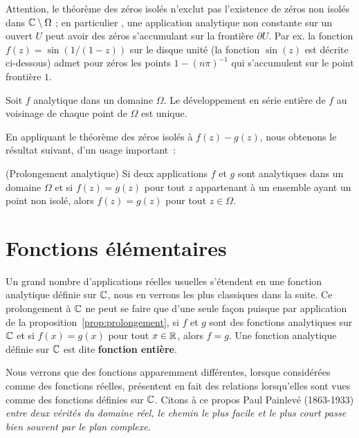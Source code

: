 \begin{rem}
Attention, le théorème des zéros isolés n'exclut pas l'existence de zéros non isolés dans $\mathbb{C} \setminus \Omega$ ; en particulier , une application analytique non constante sur un ouvert $U$ peut avoir des zéros s'accumulant sur la frontière $\partial U$. Par ex. la fonction $f(z)=\sin(1/(1-z))$ sur le disque unité (la fonction $\sin(z)$ est décrite ci-dessous) admet pour zéros les points $1-(n\pi)^{-1}$ qui s'accumulent sur le point frontière $1$. 
\end{rem}


\begin{fprop}
Soit $f$ analytique dans un domaine $\Omega$. Le développement en série entière
de $f$ au voisinage de chaque point de $\Omega$ est unique.
\end{fprop}



En appliquant le théorème des zéros isolés à $f(z)-g(z)$, nous obtenons le résultat suivant, d'un usage important~:
\begin{fprop}(Prolongement analytique) \label{prop:prolongement}
Si deux applications $f$ et $g$ sont analytiques dans un domaine $\Omega$ et si $f(z)=g(z)$ pour tout $z$ appartenant à un ensemble ayant un point non isolé, alors $f(z)=g(z)$ pour tout $z \in \Omega$.
\end{fprop}




 
\section{Fonctions élémentaires}

Un grand nombre d'applications réelles usuelles s'étendent en une fonction analytique définie sur $\mathbb{C}$, nous en verrons les plus classiques dans la suite. Ce prolongement à $\mathbb{C}$ ne peut se faire que d'une seule façon puisque par application de la proposition~\ref{prop:prolongement}, si $f$ et $g$ sont des fonctions analytiques sur $\mathbb{C}$ et si $f(x)=g(x)$ pour tout $x \in \mathbb R$, alors $f=g$. Une fonction analytique définie sur $\mathbb{C}$ est dite \textbf{fonction entière}.

Nous verrons que des fonctions apparemment différentes, lorsque considérées comme des fonctions réelles, présentent en fait des relations lorsqu'elles sont vues comme des fonctions définies sur $\mathbb{C}$. Citons à ce propos Paul Painlevé (1863-1933) \og \emph{entre deux vérités du domaine réel, le chemin le plus facile et le plus court passe bien souvent par le plan complexe}\fg{}.


